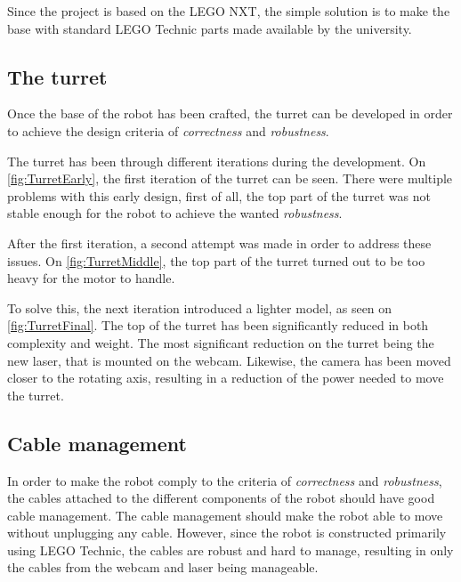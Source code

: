 Since the project is based on the LEGO NXT, the simple solution is to make the base with standard LEGO Technic parts made available by the university. 

\subsection{The turret}
Once the base of the robot has been crafted, the turret can be developed in order to achieve the design criteria of \textit{correctness} and \textit{robustness}. 

The turret has been through different iterations during the development. 
On \autoref{fig:TurretEarly}, the first iteration of the turret can be seen.
There were multiple problems with this early design, first of all, the top part of the turret was not stable enough for the robot to achieve the wanted \textit{robustness}.

After the first iteration, a second attempt was made in order to address these issues. 
On \autoref{fig:TurretMiddle}, the top part of the turret turned out to be too heavy for the motor to handle. 

To solve this, the next iteration introduced a lighter model, as seen on \autoref{fig:TurretFinal}.
The top of the turret has been significantly reduced in both complexity and weight. 
The most significant reduction on the turret being the new laser, that is mounted on the webcam.
Likewise, the camera has been moved closer to the rotating axis, resulting in a reduction of the power needed to move the turret. 

\subsection{Cable management}
In order to make the robot comply to the criteria of \textit{correctness} and \textit{robustness}, the cables attached to the different components of the robot should have good cable management. 
The cable management should make the robot able to move without unplugging any cable.
However, since the robot is constructed primarily using LEGO Technic, the cables are robust and hard to manage, resulting in only the cables from the webcam and laser being manageable. 
